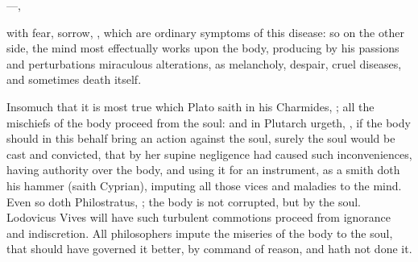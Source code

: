 {{---,

with fear, sorrow, \etc{}, which are ordinary symptoms of this disease: so
on the other side, the mind most effectually works upon the body,
producing by his passions and perturbations miraculous alterations, as
melancholy, despair, cruel diseases, and sometimes death itself.

Insomuch that it is most true which Plato saith in his Charmides, ; all the mischiefs of the body
proceed from the soul: and \Democritus{} in Plutarch urgeth,
, if the body should in this behalf bring
an action against the soul, surely the soul would be cast and
convicted, that by her supine negligence had caused such
inconveniences, having authority over the body, and using it for an
instrument, as a smith doth his hammer (saith Cyprian), imputing
all those vices and maladies to the mind. Even so doth
Philostratus, ; the
body is not corrupted, but by the soul. Lodovicus Vives will have such
turbulent commotions proceed from ignorance and indiscretion. All
philosophers impute the miseries of the body to the soul, that should
have governed it better, by command of reason, and hath not done it.

}}
